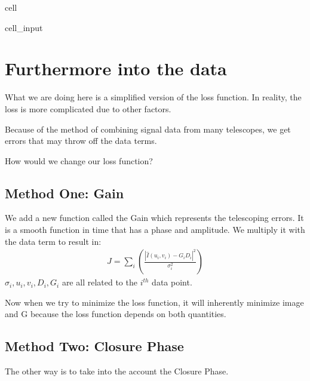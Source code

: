 \documentclass[letterpaper,10pt,english]{jupyterBook}
\begin{document}
\begin{sphinxuseclass}{cell}
\begin{sphinxVerbatimInput}
\begin{sphinxuseclass}{cell_input}
\begin{sphinxVerbatim}[commandchars=\\\{\}]
           
\end{sphinxVerbatim}

\end{sphinxuseclass}\end{sphinxVerbatimInput}

\end{sphinxuseclass}

\section{Furthermore into the data}
\label{\detokenize{loss:furthermore-into-the-data}}
\sphinxAtStartPar
What we are doing here is a simplified version of the loss function. In reality, the loss is more complicated due to other factors.

\sphinxAtStartPar
Because of the method of combining signal data from many telescopes, we get errors that may throw off the data terms.

\sphinxAtStartPar
How would we change our loss function?


\subsection{Method One: Gain}
\label{\detokenize{loss:method-one-gain}}
\sphinxAtStartPar
We add a new function called the Gain which represents the telescoping errors. It is a smooth function in time that has a phase and amplitude. We multiply it with the data term to result in:
\begin{equation*}
\begin{split}J = \sum_{i}(\frac{|\hat{I}(u_i,v_i) - G_i D_i|^2}{\sigma_i^2})\end{split}
\end{equation*}
\sphinxAtStartPar
\(\sigma_i, u_i, v_i, D_i, G_i\) are all related to the \(i^{th}\) data point.

\sphinxAtStartPar
Now when we try to minimize the loss function, it will inherently minimize image and G because the loss function depends on both quantities.


\subsection{Method Two: Closure Phase}
\label{\detokenize{loss:method-two-closure-phase}}
\sphinxAtStartPar
The other way is to take into the account the Closure Phase.
\end{document}

